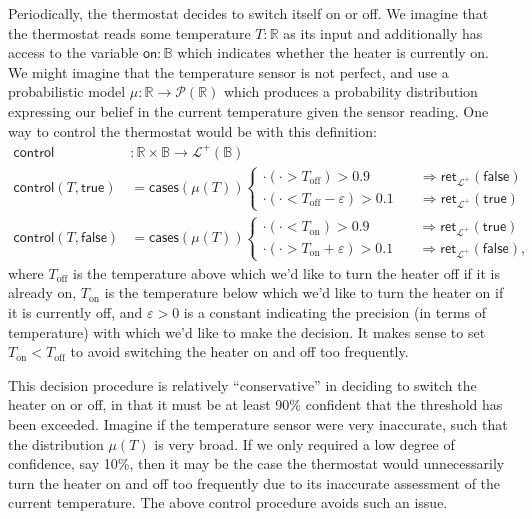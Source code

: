 \documentclass{article}           %
\newcommand{\R}{\mathbb{R}}
\newcommand{\bool}{\mathbb{B}}
\newcommand{\Prob}{\mathcal{P}}
\newcommand{\PLower}{\mathcal{L}^+}
\newcommand{\ret}[1]{\mathsf{ret}_{#1}}
\begin{document}
Periodically, the thermostat decides to switch itself on or off. We imagine that the thermostat reads some temperature $T : \R$ as its input and additionally has access to the variable $\mathsf{on} : \bool$ which indicates whether the heater is currently on. We might imagine that the temperature sensor is not perfect, and use a probabilistic model $\mu : \R \to \Prob(\R)$ which produces a probability distribution expressing our belief in the current temperature given the sensor reading. One way to control the thermostat would be with this definition:
\begin{align*}
\mathsf{control} &: \R \times \bool \to \PLower(\bool)
\\
\mathsf{control}(T, \mathsf{true}) &= 
\mathsf{cases}(\mu(T))
\begin{cases}
\cdot(\cdot > T_\text{off}) > 0.9
  \quad &\Longrightarrow
  \ret{\PLower}(\mathsf{false})
\\
\cdot(\cdot < T_\text{off} - \varepsilon) > 0.1
  \quad &\Longrightarrow
  \ret{\PLower}(\mathsf{true})
\end{cases}
\\
\mathsf{control}(T, \mathsf{false}) &= 
\mathsf{cases}(\mu(T))
\begin{cases}
\cdot(\cdot < T_\text{on}) > 0.9
  \quad &\Longrightarrow
  \ret{\PLower}(\mathsf{true})
\\
\cdot(\cdot > T_\text{on} + \varepsilon) > 0.1
  \quad &\Longrightarrow
  \ret{\PLower}(\mathsf{false}),
\end{cases}
\end{align*}
where $T_\text{off}$ is the temperature above which we'd like to turn the heater off if it is already on, $T_\text{on}$ is the temperature below which we'd like to turn the heater on if it is currently off, and $\varepsilon > 0$ is a constant indicating the precision (in terms of temperature) with which we'd like to make the decision. It makes sense to set $T_\text{on} <  T_\text{off}$ to avoid switching the heater on and off too frequently.

This decision procedure is relatively ``conservative'' in deciding to switch the heater on or off, in that it must be at least 90\% confident that the threshold has been exceeded. Imagine if the temperature sensor were very inaccurate, such that the distribution $\mu(T)$ is very broad. If we only required a low degree of confidence, say 10\%, then it may be the case the thermostat would unnecessarily turn the heater on and off too frequently due to its inaccurate assessment of the current temperature. The above control procedure avoids such an issue.
\end{document}
